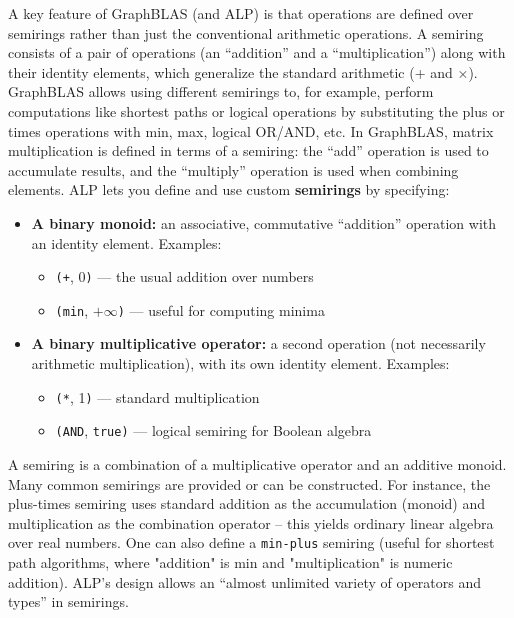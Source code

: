 A key feature of GraphBLAS (and ALP) is that operations are defined over semirings rather than just the conventional arithmetic operations. A semiring consists of a pair of operations (an “addition” and a “multiplication”) along with their identity elements, which generalize the standard arithmetic (+ and $\times$). GraphBLAS allows using different semirings to, for example, perform computations like shortest paths or logical operations by substituting the plus or times operations with min, max, logical OR/AND, etc. In GraphBLAS, matrix multiplication is defined in terms of a semiring: the “add” operation is used to accumulate results, and the “multiply” operation is used when combining elements.
ALP lets you define and use custom \textbf{semirings} by specifying:


\begin{itemize}
  \item \textbf{A binary monoid:} an associative, commutative ``addition'' operation with an identity element. Examples:
  \begin{itemize}
    \item \texttt{(+}, 0\texttt{)} — the usual addition over numbers
    \item \texttt{(min}, $+\infty$\texttt{)} — useful for computing minima
  \end{itemize}
  
  \item \textbf{A binary multiplicative operator:} a second operation (not necessarily arithmetic multiplication), with its own identity element. Examples:
  \begin{itemize}
    \item \texttt{(*}, 1\texttt{)} — standard multiplication
    \item \texttt{(AND}, \texttt{true}\texttt{)} — logical semiring for Boolean algebra
  \end{itemize}
\end{itemize}

A semiring is a combination of a multiplicative operator and an additive monoid. Many common semirings are provided or can be constructed. For instance, the plus-times semiring uses standard addition as the accumulation (monoid) and multiplication as the combination operator – this yields ordinary linear algebra over real numbers. One can also define a \texttt{min-plus} semiring (useful for shortest path algorithms, where "addition" is min and "multiplication" is numeric addition). ALP’s design allows an “almost unlimited variety of operators and types” in semirings.

